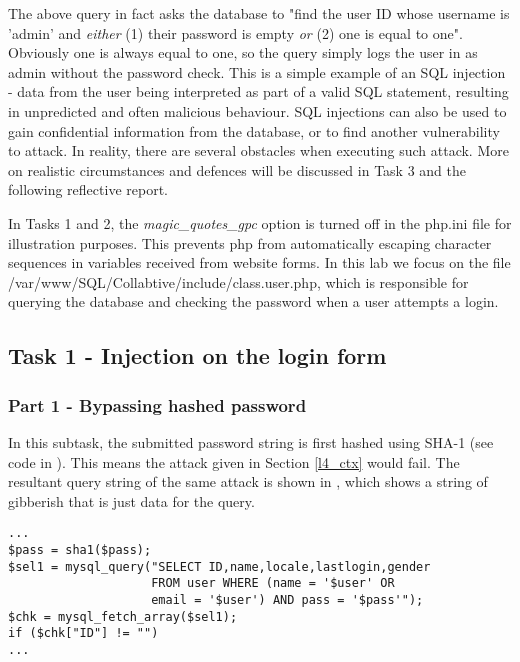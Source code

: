 The above query in fact asks the database to "find the user ID whose username is 'admin' and \emph{either} (1) their password is empty \emph{or} (2) one is equal to one". Obviously one is always equal to one, so the query simply logs the user in as admin without the password check. This is a simple example of an SQL injection - data from the user being interpreted as part of a valid SQL statement, resulting in unpredicted and often malicious behaviour. SQL injections can also be used to gain confidential information from the database, or to find another vulnerability to attack. In reality, there are several obstacles when executing such attack. More on realistic circumstances and defences will be discussed in Task 3 and the following reflective report.

In Tasks 1 and 2, the \emph{magic\_quotes\_gpc} option is turned off in the php.ini file for illustration purposes. This prevents php from automatically escaping character sequences in variables received from website forms. In this lab we focus on the file /var/www/SQL/Collabtive/include/class.user.php, which is responsible for querying the database and checking the password when a user attempts a login.

\subsection{Task 1 - Injection on the login form}
\subsubsection{Part 1 - Bypassing hashed password}
In this subtask, the submitted password string is first hashed using SHA-1 (see code in ). This means the attack given in Section \ref{l4_ctx} would fail. The resultant query string of the same attack is shown in , which shows a string of gibberish that is just data for the query.

\begin{minipage}{\linewidth}
\begin{lstlisting}[caption={Vulnerable SQL login statement},
label={lst:l4_t1p1_vulnstm},
frame=single]
...
$pass = sha1($pass);
$sel1 = mysql_query("SELECT ID,name,locale,lastlogin,gender
                    FROM user WHERE (name = '$user' OR
                    email = '$user') AND pass = '$pass'");
$chk = mysql_fetch_array($sel1);
if ($chk["ID"] != "")
...
\end{lstlisting}
\end{minipage}

